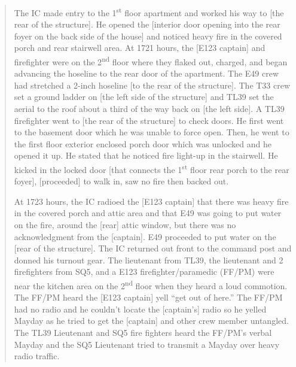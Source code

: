 \begin{quote}
The IC made entry to the 1\textsuperscript{st} floor apartment and worked his way to [the rear of the structure]. He opened the [interior door opening into the rear foyer on the back side of the house] and noticed heavy fire in the covered porch and rear stairwell area. At 1721 hours, the [E123 captain] and firefighter were on the 2\textsuperscript{nd} floor where they flaked out, charged, and began advancing the hoseline to the rear door of the apartment. The E49 crew had stretched a 2-inch hoseline [to the rear of the structure]. The T33 crew set a ground ladder on [the left side of the structure] and TL39 set the aerial to the roof about a third of the way back on [the left side]. A TL39 firefighter went to [the rear of the structure] to check doors. He first went to the basement door which he was unable to force open. Then, he went to the first floor exterior enclosed porch door which was unlocked and he opened it up. He stated that he noticed fire light-up in the stairwell. He kicked in the locked door [that connects the 1\textsuperscript{st} floor rear porch to the rear foyer], [proceeded] to walk in, saw no fire then backed out.

At 1723 hours, the IC radioed the [E123 captain] that there was heavy fire in the covered porch and attic area and that E49 was going to put water on the fire, around the [rear] attic window, but there was no acknowledgment from the [captain]. E49 proceeded to put water on the [rear of the structure]. The IC returned out front to the command post and donned his turnout gear. The lieutenant from TL39, the lieutenant and 2 firefighters from SQ5, and a E123 firefighter/paramedic (FF/PM) were near the kitchen area on the 2\textsuperscript{nd} floor when they heard a loud commotion. The FF/PM heard the [E123 captain] yell ``get out of here.'' The FF/PM had no radio and he couldn't locate the [captain's] radio so he yelled Mayday as he tried to get the [captain] and other crew member untangled. The TL39 Lieutenant and SQ5 fire fighters heard the FF/PM's verbal Mayday and the SQ5 Lieutenant tried to transmit a Mayday over heavy radio traffic.


\end{quote}
